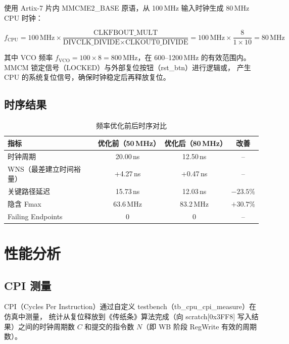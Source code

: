 \documentclass[12pt,a4paper]{ctexart}
\begin{document}
使用 Artix-7 片内 MMCME2\_BASE 原语，从 100\,MHz 输入时钟生成 80\,MHz CPU 时钟：

\[
f_{\text{CPU}} = 100\,\text{MHz} \times \frac{\text{CLKFBOUT\_MULT}}{\text{DIVCLK\_DIVIDE} \times \text{CLKOUT0\_DIVIDE}}
= 100\,\text{MHz} \times \frac{8}{1 \times 10} = 80\,\text{MHz}
\]

其中 VCO 频率 $f_{\text{VCO}} = 100 \times 8 = 800\,\text{MHz}$，在 600--1200\,MHz
的有效范围内。MMCM 锁定信号（LOCKED）与外部复位按钮（rst\_btn）进行逻辑或，
产生 CPU 的系统复位信号，确保时钟稳定后再释放复位。

\subsection{时序结果}

\begin{table}[H]
\centering
\caption{频率优化前后时序对比}
\begin{tabular}{@{}lccc@{}}
\toprule
\textbf{指标} & \textbf{优化前（50\,MHz）} & \textbf{优化后（80\,MHz）} & \textbf{改善} \\
\midrule
时钟周期                & 20.00\,ns  & 12.50\,ns  & -- \\
WNS（最差建立时间裕量） & +4.27\,ns  & +0.47\,ns  & -- \\
关键路径延迟            & 15.73\,ns  & 12.03\,ns  & $-23.5\%$ \\
隐含 Fmax               & 63.6\,MHz  & 83.2\,MHz  & $+30.7\%$ \\
Failing Endpoints       & 0          & 0          & -- \\
\bottomrule
\end{tabular}
\label{tab:timing}
\end{table}

\section{性能分析}

\subsection{CPI 测量}

CPI（Cycles Per Instruction）通过自定义 testbench（tb\_cpu\_cpi\_measure）在仿真中测量，
统计从复位释放到《传纸条》算法完成（向 scratch[0x3FF8] 写入结果）之间的时钟周期数 $C$
和提交的指令数 $N$（即 WB 阶段 RegWrite 有效的周期数）。
\end{document}
